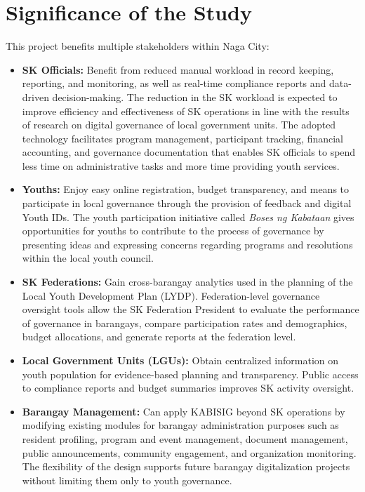 \section{Significance of the Study}
\label{sec:significance_of_the_study}

\hspace*{\parindent}This project benefits multiple stakeholders within Naga City:

\begin{itemize}
    \item \textbf{SK Officials:} Benefit from reduced manual workload in record keeping, reporting, and monitoring, as well as real-time compliance reports and data-driven decision-making. The reduction in the SK workload is expected to improve efficiency and effectiveness of SK operations in line with the results of research on digital governance of local government units. The adopted technology facilitates program management, participant tracking, financial accounting, and governance documentation that enables SK officials to spend less time on administrative tasks and more time providing youth services.
    \item \textbf{Youths:} Enjoy easy online registration, budget transparency, and means to participate in local governance through the provision of feedback and digital Youth IDs. The youth participation initiative called \textit{Boses ng Kabataan} gives opportunities for youths to contribute to the process of governance by presenting ideas and expressing concerns regarding programs and resolutions within the local youth council.
    \item \textbf{SK Federations:} Gain cross-barangay analytics used in the planning of the Local Youth Development Plan (LYDP). Federation-level governance oversight tools allow the SK Federation President to evaluate the performance of governance in barangays, compare participation rates and demographics, budget allocations, and generate reports at the federation level.
    \item \textbf{Local Government Units (LGUs):} Obtain centralized information on youth population for evidence-based planning and transparency. Public access to compliance reports and budget summaries improves SK activity oversight.
    \item \textbf{Barangay Management:} Can apply KABISIG beyond SK operations by modifying existing modules for barangay administration purposes such as resident profiling, program and event management, document management, public announcements, community engagement, and organization monitoring. The flexibility of the design supports future barangay digitalization projects without limiting them only to youth governance.

\end{itemize}
